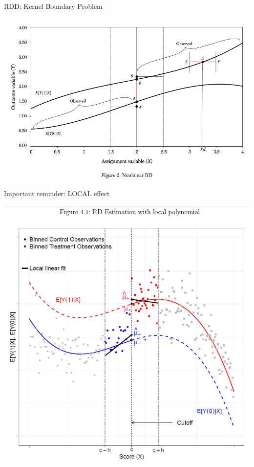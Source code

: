 \begin{frame}{RDD: Kernel Boundary Problem}
\begin{center}
\includegraphics[width=\textwidth]{./resources/ll-fig2}
\end{center}
\end{frame}

\begin{frame}{Important reminder: LOCAL effect}
  \begin{center}
  \includegraphics[width=\textwidth]{./resources/CatteneoLocpoly}
  \end{center}
\end{frame}

